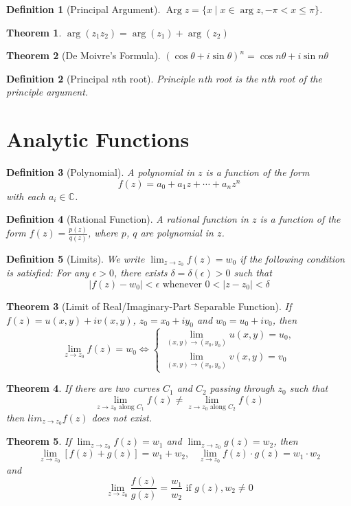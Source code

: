\documentclass[12pt]{article}
\newtheorem{definition}{Definition}[section]
\newtheorem{theorem}{Theorem}[section]
\theoremstyle{definition}
\DeclareMathOperator{\Arg}{Arg}
\begin{document}
\begin{definition}[Principal Argument]
\normalfont $\Arg z = \{x\mid x\in \arg z, -\pi<x\leq \pi\}$.
\end{definition}
\begin{theorem}$\arg(z_1z_2)=\arg(z_1) + \arg(z_2)$\end{theorem}
\begin{theorem}[De Moivre's Formula] $(\cos \theta + i\sin \theta)^n = \cos n\theta + i\sin n\theta$\end{theorem}
\begin{definition}[Principal {$n$}th root]
\normalfont Principle $n$th root is the $n$th root of the principle argument.
\end{definition}
\section{Analytic Functions}
\begin{definition}[Polynomial]
\normalfont A polynomial in $z$ is a function of the form
\[
f(z)=a_0 + a_1z+ \cdots + a_nz^n
\]
with each $a_i \in \mathbb{C}$.
\end{definition}
\begin{definition}[Rational Function]
\normalfont A rational function in $z$ is a function of the form $f(z)=\frac{p(z)}{q(z)}$, where $p$, $q$ are polynomial in $z$.
\end{definition}
\begin{definition}[Limits]
\normalfont We write $\lim_{z\to z_0}f(z)=w_0$ if the following condition is satisfied: For any $\epsilon > 0$, there exists $\delta = \delta(\epsilon)>0$ such that 
\[
|f(z)-w_0|<\epsilon \text{ whenever }0<|z-z_0|<\delta
\]
\end{definition}
\begin{theorem}[Limit of Real/Imaginary-Part Separable Function]
\normalfont If $f(z)=u(x,y) + iv(x,y)$, $z_0 = x_0 + iy_0$ and $w_0 = u_0 + iv_0$, then
\[
\lim_{z\to z_0}f(z) = w_0 \Leftrightarrow \begin{cases}\lim_{(x,y)\to(x_0, y_0)}u(x,y) = u_0, \\
\lim_{(x,y)\to(x_0, y_0)}v(x,y) = v_0\end{cases}
\]
\end{theorem}
\begin{theorem}
\normalfont If there are two curves $C_1$ and $C_2$ passing through $z_0$ such that
\[
\lim_{z\to z_0\text{ along }C_1}f(z)\neq \lim_{z\to z_0\text{ along }C_2}f(z)
\]
then $lim_{z\to z_0}f(z)$ does not exist.
\end{theorem}
\begin{theorem}\normalfont If $\lim_{z\to z_0}f(z)=w_1$ and $\lim_{z\to z_0}g(z)=w_2$, then
\[
\lim_{z\to z_0}[f(z)+g(z)]=w_1 + w_2, \;\;\;\lim_{z\to z_0}f(z)\cdot g(z) = w_1\cdot w_2
\]
and
\[
\lim_{z\to z_0}\frac{f(z)}{g(z)}=\frac{w_1}{w_2}\text{ if }g(z), w_2\neq 0
\]
\end{theorem}
\end{document}
